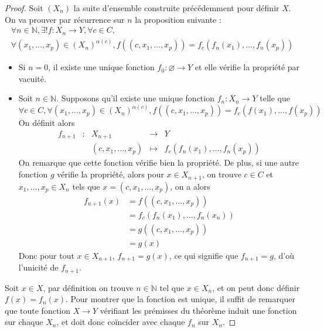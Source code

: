 \begin{proof}
  Soit $(X_n)$ la suite d'ensemble construite précédemment pour définir $X$. On
  va prouver par récurrence sur $n$ la proposition suivante :
  \begin{multline*}
    \forall n\in \mathbb N, \exists ! f : X_n \to Y, \forall c \in C,\\
    \forall (x_1,\ldots,x_p)\in (X_n)^{\alpha(c)}, f((c,x_1,\ldots,x_p))
    = f_c(f_n(x_1),\ldots,f_n(x_p))
  \end{multline*}
  \begin{itemize}
  \item Si $n = 0$, il existe une unique fonction $f_0 : \varnothing \to Y$ et
    elle vérifie la propriété par vacuité.
  \item Soit $n \in \mathbb N$. Supposons qu'il existe une unique fonction
    $f_n : X_n \to Y$ telle que
    \[\forall c\in C, \forall (x_1,\ldots,x_p)\in (X_n)^{\alpha(c)},
    f((c,x_1,\ldots,x_p)) = f_c(f(x_1),\ldots,f(x_p))\]
    On définit alors
    \[\begin{array}{rcccl}
      f_{n+1} &:& X_{n+1} &\longrightarrow & Y \\
      & & (c,x_1,\ldots,x_p) & \longmapsto & f_c(f_n(x_1),\ldots,f_n(x_p))
    \end{array}\]
    On remarque que cette fonction vérifie bien la propriété. De plus, si une
    autre fonction $g$ vérifie la propriété, alors pour $x\in X_{n+1}$, on trouve
    $c\in C$ et $x_1,\ldots,x_p \in X_n$ tels que $x = (c,x_1,\ldots,x_p)$, on a
    alors
    \begin{align*}
      f_{n+1}(x) &= f((c,x_1,\ldots,x_p)) \\
      &= f_c(f_n(x_1),\ldots,f_n(x_n)) \\
      &= g((c,x_1,\ldots,x_p))\\
      &= g (x)
    \end{align*}
    Donc pour tout $x\in X_{n+1}$, $f_{n+1} = g(x)$, ce qui signifie que
    $f_{n+1} = g$, d'où l'unicité de $f_{n+1}$.
  \end{itemize}

  Soit $x \in X$, par définition on trouve $n\in \mathbb N$ tel que $x \in X_n$,
  et on peut donc définir $f(x) = f_n(x)$. Pour montrer que la fonction est
  unique, il suffit de remarquer que toute fonction $X \to Y$ vérifiant les
  prémisses du théorème induit une fonction sur chaque $X_n$, et doit donc
  coïncider avec chaque $f_n$ sur $X_n$.
\end{proof}

